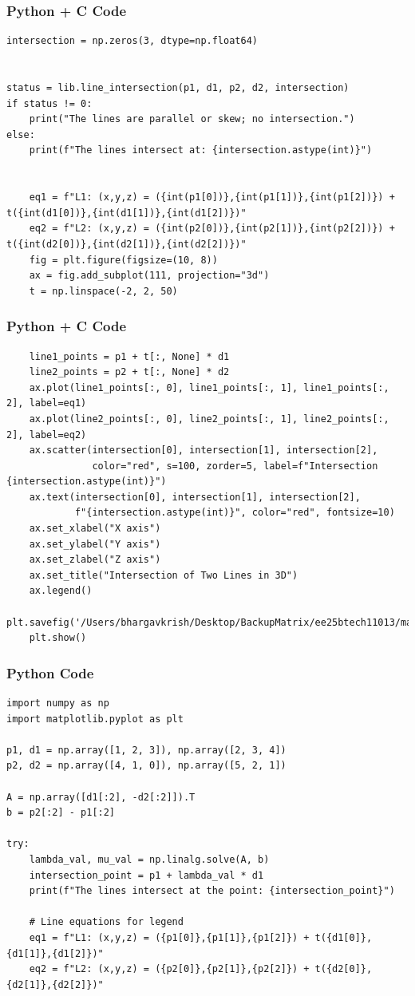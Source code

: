 \documentclass{beamer}
\begin{document}
\begin{frame}[fragile]
    \frametitle{Python + C Code}
    \begin{lstlisting}
intersection = np.zeros(3, dtype=np.float64)


status = lib.line_intersection(p1, d1, p2, d2, intersection)
if status != 0:
    print("The lines are parallel or skew; no intersection.")
else:
    print(f"The lines intersect at: {intersection.astype(int)}")


    eq1 = f"L1: (x,y,z) = ({int(p1[0])},{int(p1[1])},{int(p1[2])}) + t({int(d1[0])},{int(d1[1])},{int(d1[2])})"
    eq2 = f"L2: (x,y,z) = ({int(p2[0])},{int(p2[1])},{int(p2[2])}) + t({int(d2[0])},{int(d2[1])},{int(d2[2])})"
    fig = plt.figure(figsize=(10, 8))
    ax = fig.add_subplot(111, projection="3d")
    t = np.linspace(-2, 2, 50)
    \end{lstlisting}
\end{frame}
\begin{frame}[fragile]
    \frametitle{Python + C Code}
    \begin{lstlisting}
    line1_points = p1 + t[:, None] * d1
    line2_points = p2 + t[:, None] * d2
    ax.plot(line1_points[:, 0], line1_points[:, 1], line1_points[:, 2], label=eq1)
    ax.plot(line2_points[:, 0], line2_points[:, 1], line2_points[:, 2], label=eq2)
    ax.scatter(intersection[0], intersection[1], intersection[2],
               color="red", s=100, zorder=5, label=f"Intersection {intersection.astype(int)}")
    ax.text(intersection[0], intersection[1], intersection[2],
            f"{intersection.astype(int)}", color="red", fontsize=10)
    ax.set_xlabel("X axis")
    ax.set_ylabel("Y axis")
    ax.set_zlabel("Z axis")
    ax.set_title("Intersection of Two Lines in 3D")
    ax.legend()
    plt.savefig('/Users/bhargavkrish/Desktop/BackupMatrix/ee25btech11013/matgeo/4.10.15/figs/Figure_1.png')
    plt.show()

    \end{lstlisting}
\end{frame}
\begin{frame}[fragile]
    \frametitle{Python Code}
    \begin{lstlisting}
import numpy as np
import matplotlib.pyplot as plt

p1, d1 = np.array([1, 2, 3]), np.array([2, 3, 4])
p2, d2 = np.array([4, 1, 0]), np.array([5, 2, 1])

A = np.array([d1[:2], -d2[:2]]).T
b = p2[:2] - p1[:2]

try:
    lambda_val, mu_val = np.linalg.solve(A, b)
    intersection_point = p1 + lambda_val * d1
    print(f"The lines intersect at the point: {intersection_point}")

    # Line equations for legend
    eq1 = f"L1: (x,y,z) = ({p1[0]},{p1[1]},{p1[2]}) + t({d1[0]},{d1[1]},{d1[2]})"
    eq2 = f"L2: (x,y,z) = ({p2[0]},{p2[1]},{p2[2]}) + t({d2[0]},{d2[1]},{d2[2]})"

    
    \end{lstlisting}
\end{frame}
\end{document}
